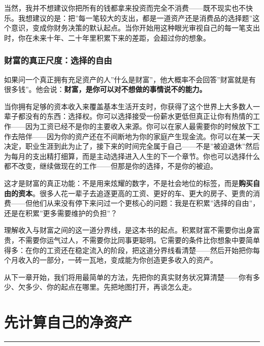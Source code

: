 \documentclass[a4paper,11pt,oneside,fontset=none,UTF8,zihao=-4]{ctexbook}
\begin{document}
当然，我并不想建议你把所有的钱都拿来投资而完全不消费------既不现实也不快乐。我想建议的是：把''每一笔较大的支出，都是一道资产还是消费品的选择题''这个意识，变成你财务决策的默认起点。当你开始用这种眼光审视自己的每一笔支出时，你在未来十年、二十年里积累下来的差距，会超过你的想象。

\subsection{财富的真正尺度：选择的自由}\label{ux8d22ux5bccux7684ux771fux6b63ux5c3aux5ea6ux9009ux62e9ux7684ux81eaux7531}

如果问一个真正拥有充足资产的人''什么是财富''，他大概率不会回答''财富就是有很多钱''。他会说：\textbf{财富，是你可以对不想做的事情说不的能力。}

当你拥有足够的资本收入来覆盖基本生活开支时，你获得了这个世界上大多数人一辈子都没有的东西：选择权。你可以选择接受一份薪水更低但真正让你有热情的工作------因为工资已经不是你的主要收入来源。你可以在家人最需要你的时候放下工作去陪伴------因为你的资产还在不间断地为你的家庭产生现金流。你可以在某一天决定，职业生涯到此为止了，接下来的时间完全属于自己------不是''被迫退休''然后为每月的支出精打细算，而是主动选择进入人生的下一个章节。你也可以选择什么都不改变，继续做现在的工作------但那是你的选择，不是你的被迫。

这才是财富的真正功能：不是用来炫耀的数字，不是社会地位的标签，而是\textbf{购买自由的资本}。很多人花一辈子去追逐更高的工资、更好的车、更大的房子、更贵的消费------但他们从来没有停下来问过一个更核心的问题：我是在积累''选择的自由''，还是在积累''更多需要维护的负担''？

理解收入与财富之间的这一道分界线，是这本书的起点。积累财富不需要你出身富贵，不需要你运气过人，不需要你比同事更聪明。它需要的条件比你想象中要简单得多：在你的工资还在稳定流入的阶段，把这道分界线看清楚------然后开始把你每个月收入的一部分，一砖一瓦地，变成能为你创造更多收入的资产。

从下一章开始，我们将用最简单的方法，先把你的真实财务状况算清楚------你有多少、欠多少、你的起点在哪里。先把地图打开，再谈怎么走。

\newpage

\chapter{先计算自己的净资产}\label{ux5148ux8ba1ux7b97ux81eaux5df1ux7684ux51c0ux8d44ux4ea7}

\begin{center}{\color{dh-bronze}\rule{0.2\textwidth}{0.5pt}}\end{center}
\end{document}
